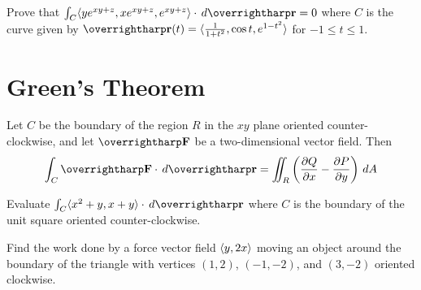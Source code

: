 \documentclass[letterpaper, twoside, 12pt]{book}
\begin{document}
          \begin{problem}
            Prove that
            $\int_C\<ye^{xy+z},xe^{xy+z},e^{xy+z}\>\cdot\dvar{\vect r}=0$
            where $C$ is the curve given by
            $\vect{r}(t)=\<\frac{1}{1+t^2},\cos t,e^{1-t^2}\>$
            for $-1 \leq t \leq 1$.
          \end{problem}

          \begin{solution}

          \end{solution}

          \begin{contributors}

          \end{contributors}


\section{Green's Theorem} %

\begin{theorem}
  Let $C$ be the boundary of the region $R$ in the $xy$ plane oriented
  counter-clockwise, and let $\vect{F}$ be a two-dimensional vector field. Then
  \[
    \int_C \vect{F}\cdot\dvar{\vect{r}}
      =
    \iint_R \left(\frac{\p Q}{\p x}-\frac{\p P}{\p y}\right)\dvar{A}
  \]
\end{theorem}

          \begin{problem}
            Evaluate $\int_C\<x^2+y,x+y\>\cdot\dvar{\vect r}$ where
            $C$ is the boundary of the unit square oriented counter-clockwise.
          \end{problem}

          \begin{solution}

          \end{solution}

          \begin{contributors}

          \end{contributors}

          \begin{problem}
            Find the work done by a force vector field $\langle y,2x\rangle$ moving an
            object around the
            boundary of the triangle with vertices $(1,2)$, $(-1,-2)$, and
            $(3,-2)$ oriented clockwise.
          \end{problem}

          \begin{solution}

          \end{solution}

          \begin{contributors}

          \end{contributors}
\end{document}
